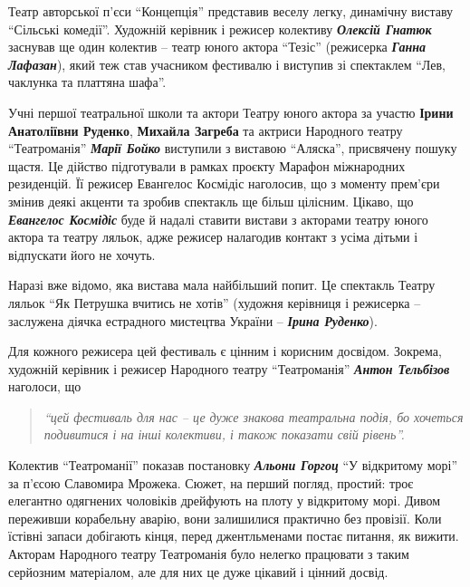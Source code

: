 
Театр авторської п'єси \enquote{Концепція} представив веселу легку, динамічну виставу
\enquote{Сільські комедії}. Художній керівник і режисер колективу \emph{\textbf{Олексій Гнатюк}}
заснував ще один колектив – театр юного актора \enquote{Тезіс} (режисерка \emph{\textbf{Ганна
Лафазан}}), який теж став учасником фестивалю і виступив зі спектаклем \enquote{Лев,
чаклунка та платтяна шафа}.


Учні першої театральної школи та актори Театру юного актора за участю \textbf{Ірини
Анатоліївни Руденко}, \textbf{Михайла Загреба} та актриси Народного театру \enquote{Театроманія}
\emph{\textbf{Марії Бойко}} виступили з виставою \enquote{Аляска}, присвячену пошуку щастя. Це дійство
підготували в рамках проєкту  Марафон міжнародних резиденцій. Її режисер
Евангелос Космідіс наголосив, що з моменту прем'єри змінив деякі акценти та
зробив спектакль ще більш цілісним. Цікаво, що \emph{\textbf{Евангелос Космідіс}} буде й надалі
ставити вистави з акторами театру юного актора та театру ляльок, адже режисер
налагодив контакт з усіма дітьми і відпускати його не хочуть.


Наразі вже відомо, яка вистава мала найбільший попит. Це спектакль Театру
ляльок \enquote{Як Петрушка вчитись не хотів} (художня керівниця і режисерка –
заслужена діячка естрадного мистецтва України – \emph{\textbf{Ірина Руденко}}).

Для кожного режисера цей фестиваль є цінним і корисним досвідом. Зокрема,
художній керівник і режисер Народного театру \enquote{Театроманія} \emph{\textbf{Антон Тельбізов}}
наголоси, що 

\begin{quote}
\em\enquote{цей фестиваль для нас – це дуже знакова театральна подія, бо
хочеться подивитися і на інші колективи, і також показати свій рівень}.
\end{quote}

Колектив \enquote{Театроманії} показав постановку \emph{\textbf{Альони Горгоц}}
\enquote{У відкритому морі} за п'єсою Славомира Мрожека. Сюжет, на перший
погляд, простий: троє елегантно одягнених чоловіків дрейфують на плоту у
відкритому морі. Дивом переживши корабельну аварію, вони залишилися практично
без провізії. Коли їстівні запаси добігають кінця, перед джентльменами постає
питання, як вижити. Акторам Народного театру Театроманія було нелегко працювати
з таким серйозним матеріалом, але для них це дуже цікавий і цінний досвід.

